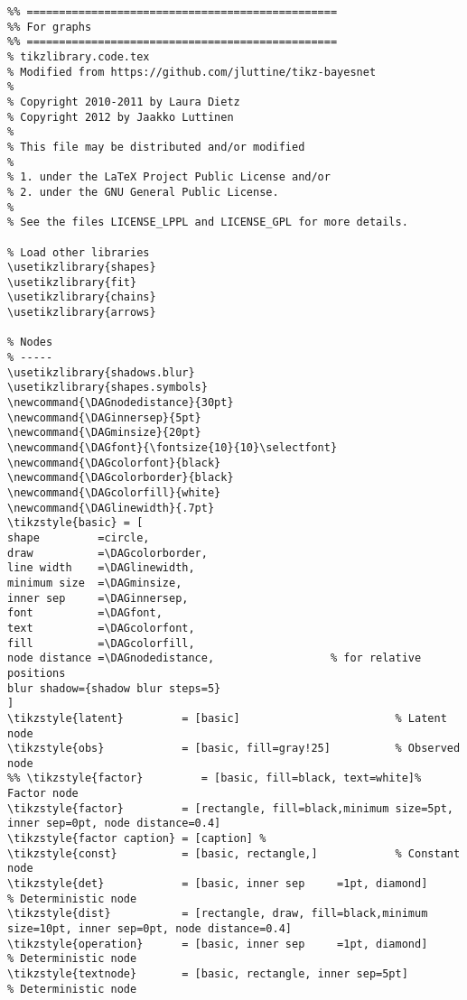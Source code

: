 \documentclass[a4paper]{article}
\begin{document}
\lstset{numbers=left,language=[LaTeX]TeX,label= ,caption= ,captionpos=b}
\begin{lstlisting}
%% ================================================
%% For graphs
%% ================================================
% tikzlibrary.code.tex
% Modified from https://github.com/jluttine/tikz-bayesnet
% 
% Copyright 2010-2011 by Laura Dietz
% Copyright 2012 by Jaakko Luttinen
%
% This file may be distributed and/or modified
%
% 1. under the LaTeX Project Public License and/or
% 2. under the GNU General Public License.
%
% See the files LICENSE_LPPL and LICENSE_GPL for more details.

% Load other libraries
\usetikzlibrary{shapes}
\usetikzlibrary{fit}
\usetikzlibrary{chains}
\usetikzlibrary{arrows}

% Nodes
% ----- 
\usetikzlibrary{shadows.blur}
\usetikzlibrary{shapes.symbols}
\newcommand{\DAGnodedistance}{30pt}
\newcommand{\DAGinnersep}{5pt}
\newcommand{\DAGminsize}{20pt}
\newcommand{\DAGfont}{\fontsize{10}{10}\selectfont}
\newcommand{\DAGcolorfont}{black}
\newcommand{\DAGcolorborder}{black}
\newcommand{\DAGcolorfill}{white}
\newcommand{\DAGlinewidth}{.7pt}
\tikzstyle{basic} = [
shape         =circle, 
draw          =\DAGcolorborder,
line width    =\DAGlinewidth,
minimum size  =\DAGminsize,
inner sep     =\DAGinnersep,
font          =\DAGfont,
text          =\DAGcolorfont,
fill          =\DAGcolorfill,
node distance =\DAGnodedistance,                  % for relative positions
blur shadow={shadow blur steps=5}
]
\tikzstyle{latent}         = [basic]                        % Latent node
\tikzstyle{obs}            = [basic, fill=gray!25]          % Observed node
%% \tikzstyle{factor}         = [basic, fill=black, text=white]% Factor node
\tikzstyle{factor}         = [rectangle, fill=black,minimum size=5pt, inner sep=0pt, node distance=0.4]
\tikzstyle{factor caption} = [caption] %
\tikzstyle{const}          = [basic, rectangle,]            % Constant node
\tikzstyle{det}            = [basic, inner sep     =1pt, diamond]               % Deterministic node
\tikzstyle{dist}           = [rectangle, draw, fill=black,minimum size=10pt, inner sep=0pt, node distance=0.4]
\tikzstyle{operation}      = [basic, inner sep     =1pt, diamond]               % Deterministic node
\tikzstyle{textnode}       = [basic, rectangle, inner sep=5pt]               % Deterministic node



\end{lstlisting}
\end{document}
